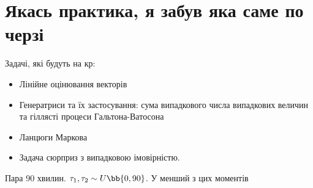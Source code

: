\section{Якась практика, я забув яка саме по черзі} 
Задачі, які будуть на кр:
\begin{itemize}
\item Лінійне оцінювання векторів
\item Генератриси та їх застосування: сума випадкового числа випадкових величин та гіллясті процеси Гальтона-Ватосона
\item Ланцюги Маркова
\item Задача сюрприз з випадковою імовірністю.
\end{itemize}
\begin{tsk}
Пара 90 хвилин. $\tau_1,\tau_2\sim U\bb{0,90}$. У менший з цих моментів 
\end{tsk}